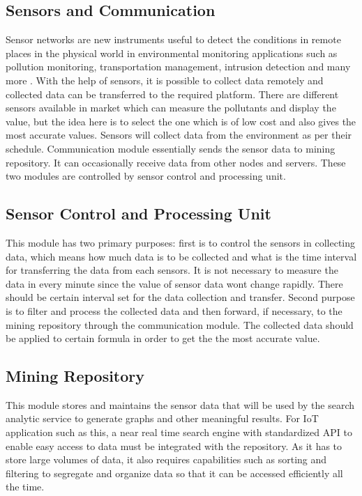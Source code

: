 \documentclass[11pt]{article}
\begin{document}
\subsection{Sensors and Communication}

Sensor networks are new instruments useful to detect the conditions in remote places in the physical world \cite{JD04} in environmental monitoring applications such as pollution monitoring, transportation management, intrusion detection and many more \cite{JLLLNBNR11}. With the help of sensors, it is possible to collect data remotely and collected data can be transferred to the required platform.
There are different sensors available in market which can measure the pollutants and display the value, but the idea here is to select the one which is of low cost and also gives the most accurate values.
Sensors will collect data from the environment as per their schedule. Communication module essentially sends the sensor data to mining repository. It can occasionally receive data from other nodes and servers. These two modules are controlled by sensor control and processing unit.

\subsection{Sensor Control and Processing Unit}
This module has two primary purposes:
 first is to control the sensors in collecting data, which means how much data is to be collected and what is the time interval for transferring the data from each sensors. It is not necessary to measure the data in every minute since the value of sensor data wont change rapidly. There should be certain interval set for the data collection and transfer. Second purpose is to filter and process the collected data and then forward, if necessary, to the mining repository through the communication module. The collected data should be applied to certain formula in order to get the the most accurate value.
 
 \subsection{Mining Repository}
 This module stores and maintains the sensor data that will be used by the search analytic service to generate graphs and other meaningful results. For IoT application such as this, a near real time search engine with standardized API to enable easy access to data must be integrated with the repository. As it has to store large volumes of data, it also requires capabilities such as sorting and filtering to segregate and organize data so that it can be accessed efficiently all the time.
 
\end{document}
